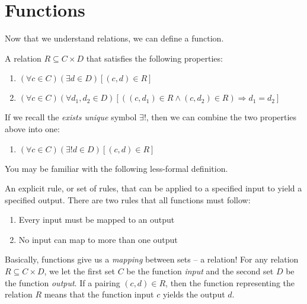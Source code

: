 \documentclass[main.tex]{subfiles}
\begin{document}
\section{Functions}

Now that we understand relations, we can define a function.

\begin{defn}
	A relation \(R \subseteq C \times D\) that satisfies the following properties:
	\begin{enumerate}
		\item \((\forall c \in C)(\exists d \in D)[(c,d) \in R]\)
		\item \((\forall c \in C)(\forall d_1,d_2 \in D)[((c,d_1) \in R \land (c,d_2) \in R) \Rightarrow d_1 = d_2]\)
	\end{enumerate}
	
	If we recall the \textit{exists unique} symbol \(\exists!\), then we can combine the two properties above into one:
	\begin{enumerate}
		\item \((\forall c \in C)(\exists! d \in D)[(c,d) \in R]\)
	\end{enumerate}
\end{defn}

You may be familiar with the following less-formal definition.

\begin{defn}
	An explicit rule, or set of rules, that can be applied to a specified input to yield a specified output. There are two rules that all functions must follow:
	\begin{enumerate}
		\item Every input must be mapped to an output
		\item No input can map to more than one output
	\end{enumerate}
\end{defn}

Basically, functions give us a \textit{mapping} between sets -- a relation! For any relation \(R \subseteq C \times D\), we let the first set \(C\) be the function \textit{input} and the second set \(D\) be the function \textit{output}. If a pairing \((c,d) \in R\), then the function representing the relation \(R\) means that the function input \(c\) yields the output \(d\).
\end{document}
